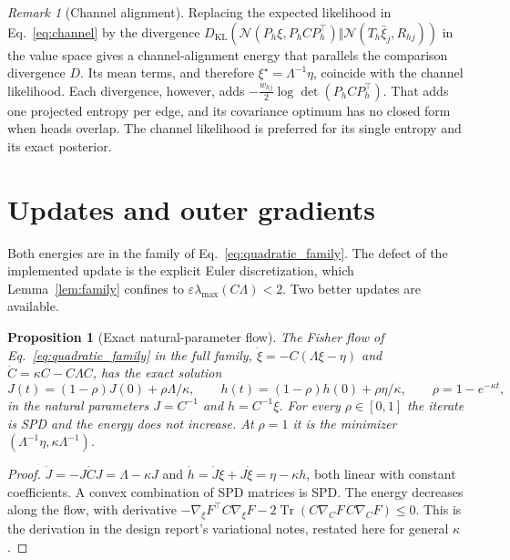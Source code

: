 \documentclass[11pt]{article}
\newtheorem{proposition}{Proposition}
\theoremstyle{definition}
\theoremstyle{remark}
\newtheorem{remark}{Remark}
\newcommand{\KL}{D_{\mathrm{KL}}}
\newcommand{\Tr}{\operatorname{Tr}}
\newcommand{\N}{\mathcal{N}}
\begin{document}
\begin{remark}[Channel alignment]
Replacing the expected likelihood in Eq.~\eqref{eq:channel} by the divergence $\KL(\N(P_h\xi,P_hCP_h^\top)\Vert\N(T_h\bar\xi_j,R_{hj}))$ in the value space gives a channel-alignment energy that parallels the comparison divergence $D$. Its mean terms, and therefore $\xi^\star=\Lambda^{-1}\eta$, coincide with the channel likelihood. Each divergence, however, adds $-\tfrac{w_{hj}}{2}\log\det(P_hCP_h^\top)$. That adds one projected entropy per edge, and its covariance optimum has no closed form when heads overlap. The channel likelihood is preferred for its single entropy and its exact posterior.
\end{remark}

\section{Updates and outer gradients}
\label{sec:updates}

Both energies are in the family of Eq.~\eqref{eq:quadratic_family}. The defect of the implemented update is the explicit Euler discretization, which Lemma~\ref{lem:family} confines to $\varepsilon\lambda_{\max}(C\Lambda)<2$. Two better updates are available.

\begin{proposition}[Exact natural-parameter flow]
\label{prop:flow}
The Fisher flow of Eq.~\eqref{eq:quadratic_family} in the full family, $\dot\xi=-C(\Lambda\xi-\eta)$ and $\dot C=\kappa C-C\Lambda C$, has the exact solution
\begin{equation}
J(t)=(1-\rho)J(0)+\rho\Lambda/\kappa,\qquad h(t)=(1-\rho)h(0)+\rho\eta/\kappa,\qquad \rho=1-e^{-\kappa t},
\end{equation}
in the natural parameters $J=C^{-1}$ and $h=C^{-1}\xi$. For every $\rho\in[0,1]$ the iterate is SPD and the energy does not increase. At $\rho=1$ it is the minimizer $(\Lambda^{-1}\eta,\kappa\Lambda^{-1})$.
\end{proposition}

\begin{proof}
$\dot J=-J\dot CJ=\Lambda-\kappa J$ and $\dot h=\dot J\xi+J\dot\xi=\eta-\kappa h$, both linear with constant coefficients. A convex combination of SPD matrices is SPD. The energy decreases along the flow, with derivative $-\nabla_\xi F^\top C\nabla_\xi F-2\Tr(C\nabla_CF\,C\nabla_CF)\le0$. This is the derivation in the design report's variational notes, restated here for general $\kappa$.
\end{proof}
\end{document}
